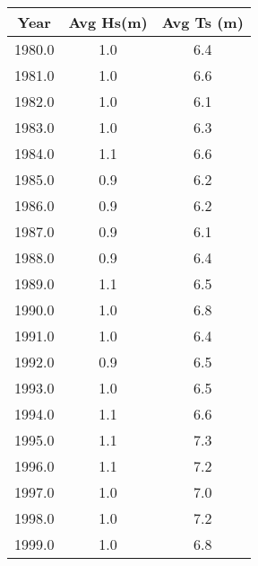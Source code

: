\begin{tabular}{ccc}
Year & Avg Hs(m) & Avg Ts (m)\\ \hline
1980.0 & 1.0 & 6.4 \\
1981.0 & 1.0 & 6.6 \\
1982.0 & 1.0 & 6.1 \\
1983.0 & 1.0 & 6.3 \\
1984.0 & 1.1 & 6.6 \\
1985.0 & 0.9 & 6.2 \\
1986.0 & 0.9 & 6.2 \\
1987.0 & 0.9 & 6.1 \\
1988.0 & 0.9 & 6.4 \\
1989.0 & 1.1 & 6.5 \\
1990.0 & 1.0 & 6.8 \\
1991.0 & 1.0 & 6.4 \\
1992.0 & 0.9 & 6.5 \\
1993.0 & 1.0 & 6.5 \\
1994.0 & 1.1 & 6.6 \\
1995.0 & 1.1 & 7.3 \\
1996.0 & 1.1 & 7.2 \\
1997.0 & 1.0 & 7.0 \\
1998.0 & 1.0 & 7.2 \\
1999.0 & 1.0 & 6.8 \\
\hline
\end{tabular}
